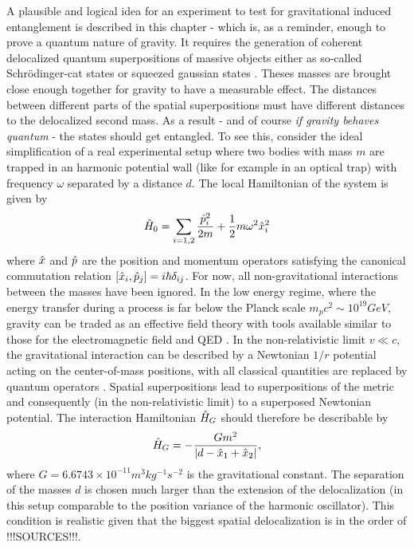 A plausible and logical idea for an experiment to test for gravitational induced entanglement is described in this chapter - which is, as a reminder, enough to prove a quantum nature of gravity.
It requires the generation of coherent delocalized quantum superpositions of massive objects either as so-called Schrödinger-cat states or squeezed gaussian states \cite{Bose_2017, Pedernales_2023}. Theses masses are brought close enough together for gravity to have a measurable effect. The distances between different parts of the spatial superpositions must have different distances to the delocalized second mass. As a result - and of course \textit{if gravity behaves quantum} - the states should get entangled.
To see this, consider the ideal simplification of a real experimental setup where two bodies with mass $m$ are trapped in an harmonic potential wall (like for example in an optical trap) with frequency $\omega$ separated by a distance $d$. The local Hamiltonian of the system is given by
\begin{equation}
  \hat{H}_0 = \sum_{i = 1,2} \frac{\hat{p}_i^2}{2m} + \frac{1}{2}m\omega^2\hat{x}^2_i
\end{equation}
where $\hat{x}$ and $\hat{p}$ are the position and momentum operators satisfying the canonical commutation relation $[\hat{x}_i, \hat{p}_j] = i\hbar \delta_{ij}$.
For now, all non-gravitational interactions between the masses have been ignored. 
In the low energy regime, where the energy transfer during a process is far below the Planck scale $m_p c^2 \sim 10^{19}\si{GeV}$, gravity can be traded as an effective field theory with tools available similar to those for the electromagnetic field and QED \cite{Carney_2018}. 
In the non-relativistic limit $v \ll c$, the gravitational interaction can be described by a Newtonian $1/r$ potential acting on the center-of-mass positions, with all classical quantities are replaced by quantum operators \cite{Carney_2018,Pedernales_2023,Christodoulou_2022}. 
Spatial superpositions lead to superpositions of the metric and consequently (in the non-relativistic limit) to a superposed Newtonian potential.
The interaction Hamiltonian $\hat{H}_G$ should therefore be describable by
\begin{equation}\label{eq:2:gravity-hamiltonian}
  \hat{H}_G = - \frac{Gm^2}{\left\lvert d - \hat{x}_1 + \hat{x}_2\right\rvert} ,
\end{equation}
where $G=6.6743 \times 10^{-11} \si{m^3 kg^{-1} s^{-2}}$ is the gravitational constant. The separation of the masses $d$ is chosen much larger than the extension of the delocalization (in this setup comparable to the position variance of the harmonic oscillator). This condition is realistic given that the biggest spatial delocalization is in the order of !!!SOURCES!!!.
